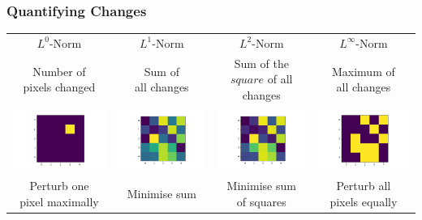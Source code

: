 \documentclass[10pt,usepdftitle=false,aspectratio=169]{beamer}
\begin{document}
\begin{frame}[fragile]
	\frametitle{Quantifying Changes}

	\begin{tabular}{cccc}
		
	$L^0$-Norm & 	$L^1$-Norm & 	$L^2$-Norm & 	$L^\infty$-Norm \vspace{5pt} \\
	
	
	
	\shortstack{Number of \\ pixels changed} & \shortstack{Sum of \\ all changes} & \shortstack{Sum of the $square$ \\ of all changes} & \shortstack{Maximum of \\ all changes} \\
	
	\includegraphics[align=c,width=0.3\columnwidth]{plots/L0.png} &
	\includegraphics[align=c,width=0.3\columnwidth]{plots/L1.png} &
	\includegraphics[align=c,width=0.3\columnwidth]{plots/L2.png} &
	\includegraphics[align=c,width=0.3\columnwidth]{plots/Linf.png} 
	\\
	
	\shortstack{ Perturb one \\ pixel maximally}&Minimise sum&\shortstack{Minimise sum \\ of squares}&\shortstack{Perturb all \\ pixels equally}
	\end{tabular}
\end{frame}
\end{document}
